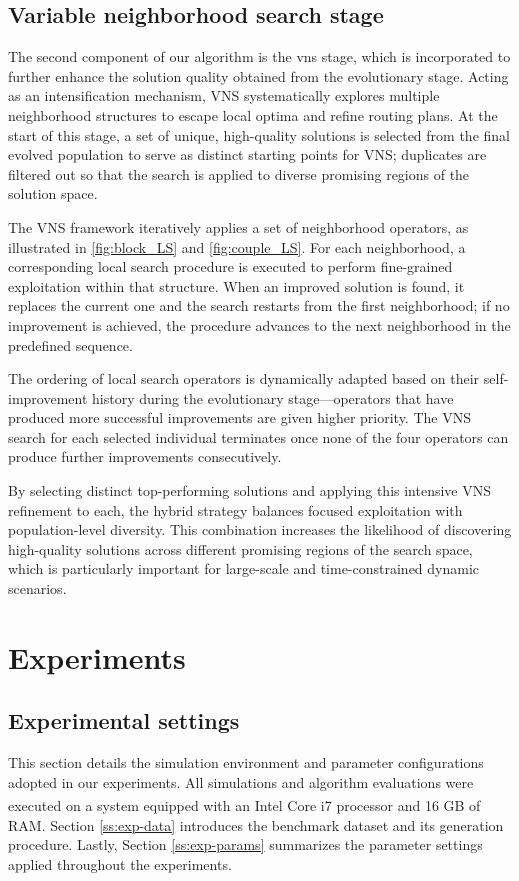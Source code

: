 \documentclass[preprint,12pt]{elsarticle}
\begin{document}
\subsection{Variable neighborhood search stage}
The second component of our algorithm is the \gls{vns} stage, which is incorporated to further enhance the solution quality obtained from the evolutionary stage. Acting as an intensification mechanism, VNS systematically explores multiple neighborhood structures to escape local optima and refine routing plans. At the start of this stage, a set of unique, high-quality solutions is selected from the final evolved population to serve as distinct starting points for VNS; duplicates  are filtered out so that the search is applied to diverse promising regions of the solution space.

The VNS framework iteratively applies a set of neighborhood operators, as illustrated in \autoref{fig:block_LS} and \autoref{fig:couple_LS}. For each neighborhood, a corresponding local search procedure is executed to perform fine-grained exploitation within that structure. When an improved solution is found, it replaces the current one and the search restarts from the first neighborhood; if no improvement is achieved, the procedure advances to the next neighborhood in the predefined sequence.

The ordering of local search operators is dynamically adapted based on their self-improvement history during the evolutionary stage—operators that have produced more successful improvements are given higher priority. The VNS search for each selected individual terminates once none of the four operators can produce further improvements consecutively.

By selecting distinct top-performing solutions and applying this intensive VNS refinement to each, the hybrid strategy balances focused exploitation with population-level diversity. This combination increases the likelihood of discovering high-quality solutions across different promising regions of the search space, which is particularly important for large-scale and time-constrained dynamic scenarios.


\section{Experiments}\label{sec:exp}
\subsection{Experimental settings}
This section details the simulation environment and parameter configurations adopted in our experiments. All simulations and algorithm evaluations were executed on a system equipped with an Intel \textsuperscript{\textregistered} Core\textsuperscript{\texttrademark} i7 processor and 16 GB of RAM. Section \ref{ss:exp-data} introduces the benchmark dataset and its generation procedure. Lastly, Section \ref{ss:exp-params} summarizes the parameter settings applied throughout the experiments.
\end{document}
